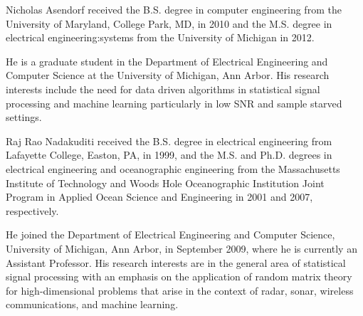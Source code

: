 \documentclass[10pt,twocolumn,twoside]{IEEEtran}
\begin{document}
\ifCLASSOPTIONcaptionsoff
  \newpage
\fi




%

\begin{IEEEbiography}{Nicholas Asendorf}
received the B.S. degree in computer engineering from the University of Maryland, College Park, MD, in 2010 and the M.S. degree in electrical engineering:systems from the University of Michigan in 2012.

He is a graduate student in the Department of Electrical Engineering and Computer Science at the University of Michigan, Ann Arbor. His research interests include the need for data driven algorithms in statistical signal processing and machine learning particularly in low SNR and sample starved settings.
\end{IEEEbiography}

\begin{IEEEbiography}{Raj Rao Nadakuditi}
received the B.S. degree in electrical engineering from Lafayette College, Easton, PA, in 1999, and the M.S. and Ph.D. degrees
in electrical engineering and oceanographic engineering from the Massachusetts Institute of Technology and Woods Hole Oceanographic Institution Joint Program in Applied Ocean Science and Engineering in 2001 and 2007, respectively.

He joined the Department of Electrical Engineering and Computer Science, University of Michigan, Ann Arbor, in September 2009, where he is currently an Assistant Professor. His research interests are in the general area of statistical signal processing with an emphasis on the application of random matrix theory for high-dimensional problems that arise in the context of radar, sonar, wireless communications, and machine learning.
\end{IEEEbiography}
\end{document}
